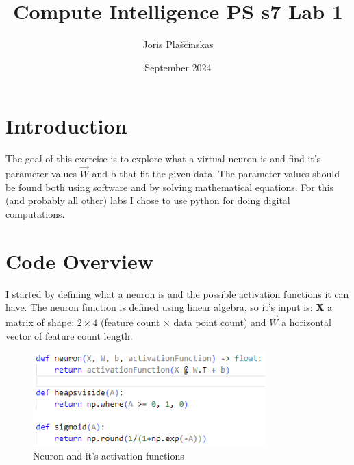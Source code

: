 \documentclass{article}
\title{Compute Intelligence PS s7 Lab 1}
\author{Joris Plaščinskas}
\date{September 2024}
\begin{document}
    \maketitle
    \section{Introduction}
        The goal of this exercise is to explore what a virtual neuron is and find it's parameter values $\vec{W}$ and b that fit the given data. The parameter values should be found both using software and by solving mathematical equations. For this (and probably all other) labs I chose to use python for doing digital computations.
    \section{Code Overview}
        I started by defining what a neuron is and the possible activation functions it can have. The neuron function is defined using linear algebra, so it's input is: $\mathbf{X}$ a matrix of shape: $2 \times 4$ (feature count $\times$ data point count) and $\vec{W}$ a horizontal vector of feature count length.
        \begin{figure}[H]
            \centering
            \includegraphics[width=0.8\textwidth]{ml.png}
            \caption{Neuron and it's activation functions}
            \label{fig:ml}
        \end{figure}
    
\end{document}
